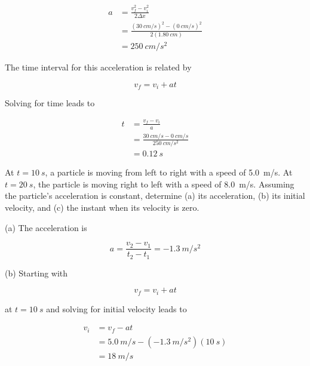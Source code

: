 \documentclass[]{exam}
\theoremstyle{definition}
\begin{document}
\begin{questions}
\begin{solution}
\begin{align*}
    a &= \frac{v_f^2 - v_i^2}{2 \Delta x} \\[1ex]
    &= \frac{(\SI{30}{cm/s})^2 - (\SI{0}{cm/s})^2}{2(\SI{1.80}{cm})} \\[1ex]
    &= \SI{250}{cm/s^2}
\end{align*}

The time interval for this acceleration is related by

\begin{equation*}
    v_f = v_i + at
\end{equation*}

Solving for time leads to

\begin{align*}
    t &= \frac{v_f - v_i}{a} \\[1ex]
    &= \frac{\SI{30}{cm/s} - \SI{0}{cm/s}}{\SI{250}{cm/s^2}} \\[1ex]
    &= \boxed{\SI{0.12}{s}}
\end{align*}
\end{solution}

\question \label{kinematic-particle} %
At $t = \SI{10}{s}$, a particle is moving from left to right with a speed of \SI{5.0}{m/s}. At $t = \SI{20}{s}$, the particle is moving right to left with a speed of \SI{8.0}{m/s}. Assuming the particle's acceleration is constant, determine (a) its acceleration, (b) its initial velocity, and (c) the instant when its velocity is zero.

\begin{solution}
(a) The acceleration is

    \begin{equation*}
        a = \frac{v_2 - v_1}{t_2 - t_1} = \SI{-1.3}{m/s^2}
    \end{equation*}

(b) Starting with

    \begin{equation*}
        v_f = v_i + at
    \end{equation*}

    at $t = \SI{10}{s}$ and solving for initial velocity leads to

    \begin{align*}
        v_i &= v_f - at \\[1ex]
        &= \SI{5.0}{m/s} - (-\SI{1.3}{m/s^2}) (\SI{10}{s}) \\[1ex]
        &= \boxed{\SI{18}{m/s}}
    \end{align*}


\end{solution}
\end{questions}
\end{document}
